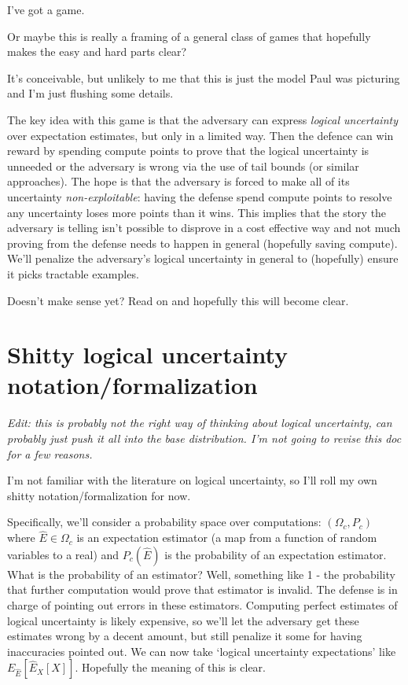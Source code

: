 \documentclass{pset}
\begin{document}
I've got a game. 

Or maybe this is really a framing of a general class of games that hopefully
makes the easy and hard parts clear?

It's conceivable, but unlikely to me that this is just the model Paul was
picturing and I'm just flushing some details.

The key idea with this game is that the adversary can express \textit{logical
uncertainty} over expectation estimates, but only in a limited way. Then the
defence can win reward by spending compute points to prove that the logical
uncertainty is unneeded or the adversary is wrong via the use of tail bounds
(or similar approaches). The hope is that the adversary is forced to make all
of its uncertainty \textit{non-exploitable}: having the defense spend compute
points to resolve any uncertainty loses more points than it wins. This implies
that the story the adversary is telling isn't possible to disprove in a cost
effective way and not much proving from the defense needs to happen in general
(hopefully saving compute). We'll penalize the adversary's logical uncertainty
in general to (hopefully) ensure it picks tractable examples. 

Doesn't make sense yet? Read on and hopefully this will become clear.

\section{Shitty logical uncertainty notation/formalization}

\textit{Edit: this is probably not the right way of thinking about logical
uncertainty, can probably just push it all into the base distribution.
I'm not going to revise this doc for a few reasons.}

I'm not familiar with the literature on logical uncertainty, so I'll roll my
own shitty notation/formalization for now.

Specifically, we'll consider a probability space over computations: $(\Omega_c,
P_c)$ where $\hat{E} \in \Omega_c$ is an expectation estimator (a map from a
function of random variables to a real) and $P_c(\hat{E})$ is the probability
of an expectation estimator. What is the probability of an estimator?
Well, something like 1 - the probability that further computation would
prove that estimator is invalid. The defense is in charge of pointing
out errors in these estimators. Computing perfect estimates of
logical uncertainty is likely expensive, so we'll let the adversary get
these estimates wrong by a decent amount, but still penalize it
some for having inaccuracies pointed out.
We can now take `logical uncertainty expectations'
like $E_{\hat{E}}[\hat{E}_X[X]]$. Hopefully the meaning of this is clear.
\end{document}
